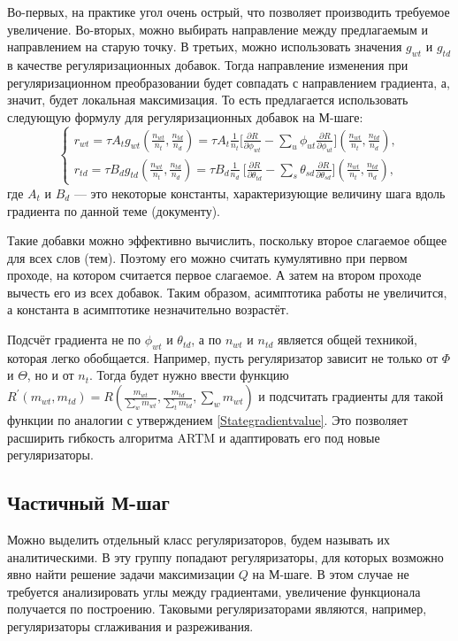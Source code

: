 \documentclass[12pt, twoside]{article}
\begin{document}
Во-первых, на практике угол очень острый, что позволяет производить требуемое увеличение. Во-вторых, можно выбирать направление между предлагаемым  и направлением на старую точку. В третьих, можно использовать значения $g_{wt}$ и $g_{td}$ в качестве регуляризационных добавок. Тогда направление изменения при регуляризационном преобразовании будет совпадать с направлением градиента, а, значит, будет локальная максимизация. То есть предлагается использовать следующую формулу для регуляризационных добавок на М-шаге:
\[
\left\{
	\begin{aligned}
		r_{wt} = \tau A_t g_{wt}\left(\frac{n_{wt}}{n_t}, \frac{n_{td}}{n_d}\right) = \tau A_t \frac{1}{n_t} \bigg[{\frac{\partial{R}}{\partial{\phi_{wt}}} - \sum\limits_u \phi_{ut} \frac{\partial{R}}{\partial{\phi_{ut}}} }\bigg] \left(\frac{n_{wt}}{n_t}, \frac{n_{td}}{n_d}\right),\\
		r_{td} = \tau B_d g_{td} \left(\frac{n_{wt}}{n_t}, \frac{n_{td}}{n_d}\right) = \tau B_d \frac{1}{n_d} \ \bigg[ {\frac{\partial{R}}{\partial{\theta_{td}}} - \sum\limits_s \theta_{sd} \frac{\partial{R}}{\partial{\theta_{sd}}} }\bigg] \left(\frac{n_{wt}}{n_t}, \frac{n_{td}}{n_d}\right) ,
	\end{aligned}
\right.
\]
где $A_t$ и $B_d$ --- это некоторые константы, характеризующие величину шага вдоль градиента по данной теме (документу).

Такие добавки можно эффективно вычислить, поскольку второе слагаемое общее для всех слов (тем). Поэтому его можно считать кумулятивно при первом проходе, на котором считается первое слагаемое. А затем на втором проходе вычесть его из всех добавок. Таким образом, асимптотика работы не увеличится, а константа в асимптотике незначительно возрастёт.

Подсчёт градиента не по $\phi_{wt}$ и $\theta_{td}$, а по $n_{wt}$ и $n_{td}$ является общей техникой, которая легко обобщается. Например, пусть регуляризатор зависит не только от $\Phi$ и $\Theta$, но и от $n_t$. Тогда будет нужно ввести функцию $R^{\prime}(m_{wt}, m_{td}) = R\left( \frac{m_{wt}}{\sum\limits_w m_{wt}},  \frac{m_{td}}{\sum\limits_t m_{td}}, \sum\limits_w m_{wt}\right)$ и подсчитать градиенты для такой функции по аналогии с утверждением \ref{Stategradientvalue}. Это позволяет расширить гибкость алгоритма ARTM и адаптировать его под новые регуляризаторы.

           \subsection{Частичный М-шаг}
Можно выделить отдельный класс регуляризаторов, будем называть их аналитическими. В эту группу попадают регуляризаторы, для которых возможно явно найти решение  задачи  максимизации  $Q$ на М-шаге. В этом случае не требуется анализировать углы между градиентами, увеличение функционала получается по построению. Таковыми регуляризаторами являются, например, регуляризаторы сглаживания и разреживания. 
\end{document}
